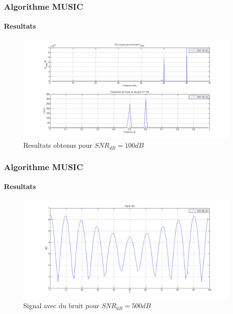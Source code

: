 \documentclass[10pt]{beamer}
\begin{document}
        
    \begin{frame}
        \frametitle{Algorithme MUSIC}
        \framesubtitle{Resultats}
        
        \begin{figure}[h]
            \includegraphics[scale=0.28 ]{images/snr100}
            \caption{Resultats obtenus pour \(SNR_{dB} = 100 dB\)}
            \label{fig:snr100}
        \end{figure}
        
    \end{frame}
    
    
    \begin{frame}
        \frametitle{Algorithme MUSIC}
        \framesubtitle{Resultats}
        
        \begin{figure}[h]
            \centering
            \includegraphics[scale= 0.28 ]{images/wave500}
            \caption{Signal avec du bruit pour \(SNR_{dB} = 500 dB\)}
            \label{fig:snr0001}
        \end{figure}
        
    \end{frame}
    
\end{document}
